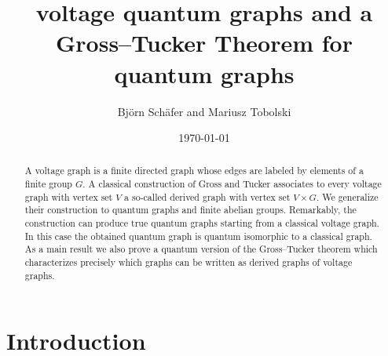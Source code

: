 \documentclass{amsart}
\title[voltage quantum graphs]{voltage quantum graphs and a Gross--Tucker Theorem for quantum graphs}
\author{Bj\"orn Sch\"afer and Mariusz Tobolski}
\date{\today}
\theoremstyle{definition}
\theoremstyle{definition}
\begin{document}
\begin{abstract}
    A voltage graph is a finite directed graph whose edges are labeled by elements of a finite group $G$. A classical construction of Gross and Tucker associates to every voltage graph with vertex set $V$ a so-called derived graph with vertex set $V \times G$. We generalize their construction to quantum graphs and finite abelian groups. Remarkably, the construction can produce true quantum graphs starting from a classical voltage graph. In this case the obtained quantum graph is quantum isomorphic to a classical graph.
    As a main result we also prove a quantum version of the Gross--Tucker theorem which characterizes precisely which graphs can be written as derived graphs of voltage graphs.
\end{abstract}

\maketitle

\section{Introduction}
\end{document}

